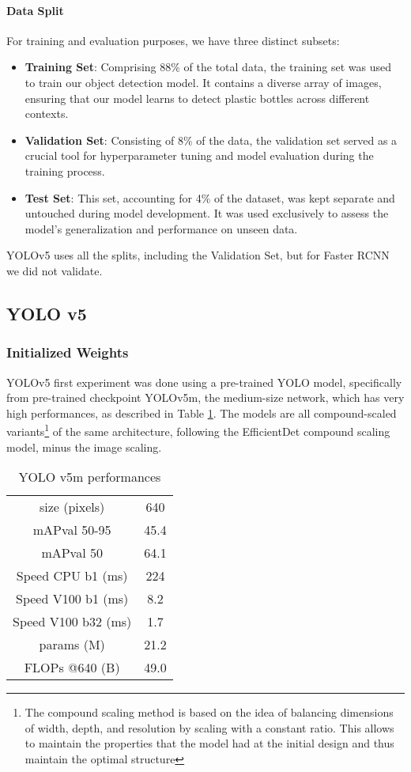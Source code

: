 \paragraph{Data Split}
For training and evaluation purposes, we have three distinct subsets:
\begin{itemize}
    \item \textbf{Training Set}: Comprising 88\% of the total data, the training set was used to train our object detection model. It contains a diverse array of images, ensuring that our model learns to detect plastic bottles across different contexts.
    \item \textbf{Validation Set}: Consisting of 8\% of the data, the validation set served as a crucial tool for hyperparameter tuning and model evaluation during the training process.
    \item \textbf{Test Set}: This set, accounting for 4\% of the dataset, was kept separate and untouched during model development. It was used exclusively to assess the model's generalization and performance on unseen data.
\end{itemize}
YOLOv5 uses all the splits, including the Validation Set, but for Faster RCNN we did not validate.
\subsection{YOLO v5}

\subsubsection{Initialized Weights}
YOLOv5 first experiment was done using a pre-trained YOLO model, specifically from pre-trained checkpoint YOLOv5m, the medium-size network, which has very high performances, as described in Table \ref{tab:table1}. The models are all compound-scaled variants\footnote{The compound scaling method is based on the idea of balancing dimensions of width, depth, and resolution by scaling with a constant ratio. This allows to maintain the properties that the model had at the initial design and thus maintain the optimal structure} of the same architecture, following the EfficientDet compound scaling model, minus the image scaling.

\begin{table}[h!]
    \centering
    \begin{tabular}{c|c}
        size (pixels) &  640\\
        mAPval 50-95 & 45.4 \\
        mAPval 50 & 64.1 \\
        Speed CPU b1 (ms) & 224	\\
        Speed V100 b1 (ms) & 8.2 \\
        Speed V100 b32 (ms) & 1.7 \\
        params (M) & 21.2 \\
        FLOPs @640 (B) & 49.0 \\
    \end{tabular}
    \caption{YOLO v5m performances}
    \label{tab:table1}
\end{table}		

